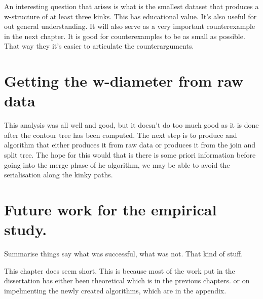 An interesting question that arises is what is the smallest dataset that produces a w-structure of at least three kinks. This has educational value. It's also useful for out general understanding. It will also serve as a very important counterexample in the next chapter. It is good for counterexamples to be as small as possible. That way they it's easier to articulate the counterarguments.

\section{Getting the w-diameter from raw data}

This analysis was all well and good, but it doesn't do too much good as it is done after the contour tree has been computed. The next step is to produce and algorithm that either produces it from raw data or produces it from the join and split tree. The hope for this would that is there is some priori information before going into the merge phase of he algorithm, we may be able to avoid the serialisation along the kinky paths.

\section{Future work for the empirical study.}

Summarise things say what was successful, what was not. That kind of stuff.

This chapter does seem short. This is because most of the work put in the dissertation has either been theoretical which is in the previous chapters. or on impelmenting the newly created algorithms, which are in the appendix.

